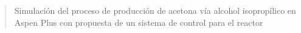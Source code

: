 \documentclass[10pt,letterpaper]{article}
\begin{document}
\thispagestyle{empty}





\begin{quote}
  \Large{Simulación del proceso de  producción de acetona vía alcohol isoprop\'{i}lico en Aspen Plus con propuesta de un sistema de control para el  reactor }
\end{quote}








%

\end{document}
